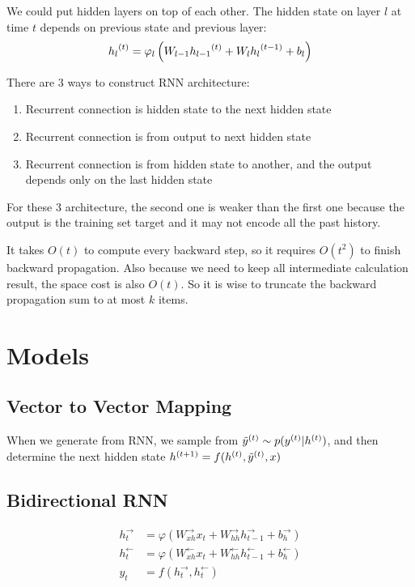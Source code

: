 We could put hidden layers on top of each other. The hidden state on layer $l$ at time $t$ depends on previous state and previous layer:
\begin{equation}
    {h_l}^{(t)} = \varphi_l \left(W_{l-1} {h_{l-1}}^{(t)} + W_l {h_l}^{(t-1)} + b_l \right)
\end{equation}



There are 3 ways to construct RNN architecture:
\begin{enumerate}
    \item Recurrent connection is hidden state to the next hidden state
    \item Recurrent connection is from output to next hidden state
    \item Recurrent connection is from hidden state to another, and the output depends only on the last hidden state
\end{enumerate}

For these 3 architecture, the second one is weaker than the first one because the output is the training set target and it may not encode all the past history. 


It takes $O(t)$ to compute every backward step, so it requires $O(t^2)$ to finish backward propagation. Also because we need to keep all intermediate calculation result, the space cost is also $O(t)$. So it is wise to truncate the backward propagation sum to at most $k$ items.




\section{Models}

\subsection{Vector to Vector Mapping}
When we generate from RNN, we sample from ${\tilde{y}}^{(t)} \sim p({y}^{(t)}|{h}^{(t)})$, and then determine the next hidden state ${h}^{(t+1)} = f({h}^{(t)}, {\tilde{y}}^{(t)}, x)$    


\subsection{Bidirectional RNN}

\begin{equation}
    \begin{aligned}
        h_t^{\rightarrow} &= \varphi(W_{xh}^{\rightarrow} x_t + W_{hh}^{\rightarrow} h_{t-1}^{\rightarrow} + b_h^{\rightarrow}) \\
        h_t^{\leftarrow} &= \varphi(W_{xh}^{\leftarrow} x_t + W_{hh}^{\leftarrow} h_{t-1}^{\leftarrow} + b_h^{\leftarrow})    \\
        y_t &= f(h_t^{\rightarrow}, h_t^{\leftarrow})
    \end{aligned}
\end{equation}

